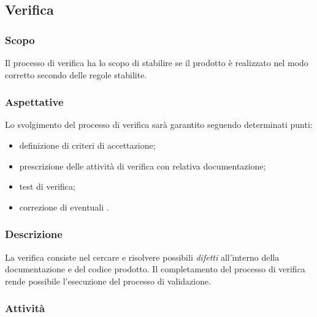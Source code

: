 \subsection{Verifica}

    \subsubsection{Scopo}
    
    Il processo di verifica ha lo scopo di stabilire se il prodotto è realizzato nel modo corretto secondo delle regole stabilite.
    
    \subsubsection{Aspettative}
    
    Lo svolgimento del processo di verifica sarà garantito seguendo determinati punti:
    
    \begin{itemize}
        \item definizione di criteri di accettazione;
	\item prescrizione delle attività di verifica con relativa documentazione;
	\item test di verifica;
	\item correzione di eventuali .
    \end{itemize}
    
    \subsubsection{Descrizione}
		La verifica consiste nel cercare e risolvere possibili \textit{difetti} all'interno della documentazione e del codice prodotto. Il completamento del processo di verifica rende possibile l'esecuzione del processo di validazione.

    \subsubsection{Attività}
